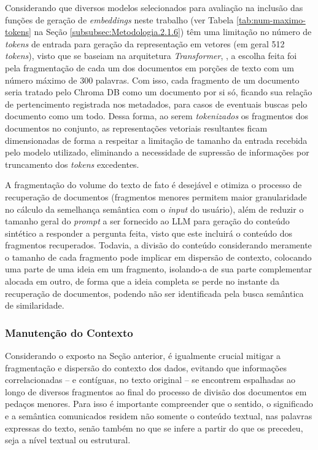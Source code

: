 Considerando que diversos modelos selecionados para avaliação na inclusão das funções de geração de \textit{embeddings} neste trabalho (ver Tabela \ref{tab:num-maximo-tokens} na Seção \ref{subsubsec:Metodologia.2.1.6}) têm uma limitação no número de \textit{tokens} de entrada para geração da representação em vetores (em geral 512 \textit{tokens}), visto que se baseiam na arquitetura \textit{Transformer}, \cite{Instructor:3}, a escolha feita foi pela fragmentação de cada um dos documentos em porções de texto com um número máximo de 300 palavras. Com isso, cada fragmento de um documento seria tratado pelo Chroma DB como um documento por si só, ficando sua relação de pertencimento registrada nos metadados, para casos de eventuais  buscas pelo documento como um todo. Dessa forma, ao serem \textit{tokenizados} os fragmentos dos documentos no conjunto, as representações vetoriais resultantes ficam dimensionadas de forma a respeitar a limitação de tamanho da entrada recebida pelo modelo utilizado, eliminando a necessidade de supressão de informações por truncamento dos \textit{tokens} excedentes.

A fragmentação do volume do texto de fato é desejável e otimiza o processo de recuperação de documentos (fragmentos menores permitem maior granularidade no cálculo da semelhança semântica com o \textit{input} do usuário), além de reduzir o tamanho geral do \textit{prompt} a ser fornecido ao \ac{LLM} para geração do conteúdo sintético a responder a pergunta feita, visto que este incluirá o conteúdo dos fragmentos recuperados. Todavia, a divisão do conteúdo considerando meramente o tamanho de cada fragmento pode implicar em dispersão de contexto, colocando uma parte de uma ideia em um fragmento, isolando-a de sua parte complementar alocada em outro, de forma que a ideia completa se perde no instante da recuperação de documentos, podendo não ser identificada pela busca semântica de similaridade.

\subsubsection{Manutenção do Contexto}
\label{subsubsec:Metodologia.1.1.2}

Considerando o exposto na Seção anterior, é igualmente crucial mitigar a fragmentação e dispersão do contexto dos dados, evitando que informações correlacionadas -- e contíguas, no texto original -- se encontrem espalhadas ao longo de diversos fragmentos ao final do processo de divisão dos documentos em pedaços menores. Para isso é importante compreender que o sentido, o significado e a semântica comunicados residem não somente o conteúdo textual, nas palavras expressas do texto, senão também no que se infere a partir do que os precedeu, seja a nível textual ou estrutural.

